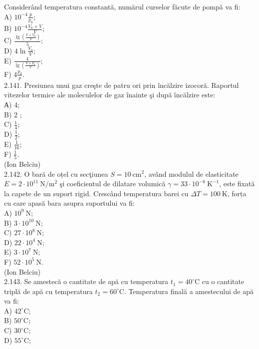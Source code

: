 \documentclass[10pt]{article}
\begin{document}
Considerând temperatura constantă, numărul curselor făcute de pompă va fi:\\
A) $10^{-4} \frac{p}{p_{0}}$;\\
B) $10^{-4} \frac{V_{0}+V}{V}$;\\
C) $\frac{\lg \left(\frac{V+V_{0}}{V}\right)}{5}$;\\
D) $4 \ln \frac{V_{0}}{V}$;\\
E) $\frac{4}{\lg \left(\frac{V+V_{0}}{V}\right)}$;\\
F) $4 \frac{p_{0}}{p}$.\\
2.141. Presiunea unui gaz creşte de patru ori prin încălzire izocoră. Raportul vitezelor termice ale moleculelor de gaz înainte şi după încălzire este:\\
А) 4;\\
B) 2 ;\\
C) $\frac{1}{4}$;\\
D) $\frac{1}{2}$;\\
E) $\frac{1}{16}$;\\
F) $\frac{1}{5}$.\\
(Ion Belciu)\\
2.142. O bară de oțel cu secţiunea $S=10 \mathrm{~cm}^{2}$, având modulul de elasticitate $E=2 \cdot 10^{11} \mathrm{~N} / \mathrm{m}^{2}$ şi coeficientul de dilatare volumică $\gamma=33 \cdot 10^{-6} \mathrm{~K}^{-1}$, este fixată la capete de un suport rigid. Crescând temperatura barei cu $\Delta T=100 \mathrm{~K}$, forța cu care apasă bara asupra suportului va fi:\\
A) $10^{9} \mathrm{~N}$;\\
B) $3 \cdot 10^{10} \mathrm{~N}$;\\
C) $27 \cdot 10^{8} \mathrm{~N}$;\\
D) $22 \cdot 10^{4} \mathrm{~N}$;\\
E) $3 \cdot 10^{7} \mathrm{~N}$;\\
F) $52 \cdot 10^{5} \mathrm{~N}$.\\
(Ion Belciu)\\
2.143. Se amestecă o cantitate de apă cu temperatura $t_{1}=40^{\circ} \mathrm{C}$ cu o cantitate triplă de apă cu temperatura $t_{2}=60^{\circ} \mathrm{C}$. Temperatura finală a amestecului de apă va fi:\\
A) $42^{\circ} \mathrm{C}$;\\
B) $50^{\circ} \mathrm{C}$;\\
C) $30^{\circ} \mathrm{C}$;\\
D) $55^{\circ} \mathrm{C}$;\\
\end{document}
